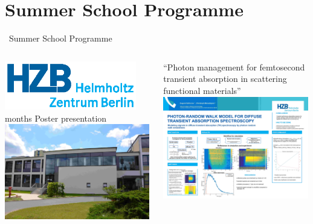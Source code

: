 \documentclass{beamer}
\begin{document}
\section{Summer School Programme}
\begin{frame}{\quad \quad ~Summer School Programme}
\begin{columns}
\begin{column}{0.39\textwidth}
\centering
\includegraphics[width = 0.9\textwidth]{Pictures/hzb_logo_cmyk}  months \newline 
\vskip 0.05cm
Poster presentation \newline
\vskip 0.1cm
\includegraphics[width = 0.99\textwidth]{Pictures/hzb-2}
\vspace{0.3cm}
\end{column}
\begin{column}{0.59\textwidth}
\centering
``Photon management for femtosecond transient absorption in scattering functional materials'' 
\linebreak
\vskip 0.5cm
\includegraphics[width=0.99\textwidth]{Pictures/test_poster3-2}

\end{column}
\end{columns}
\end{frame}
\end{document}

